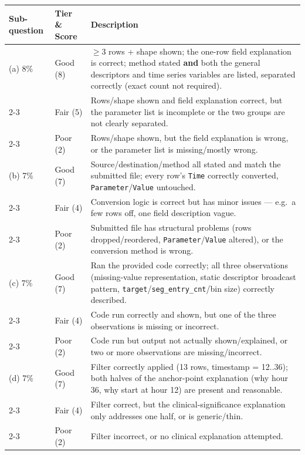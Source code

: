 \documentclass{article}
\begin{document}
\begin{center}
\footnotesize
\begin{tabular}{|p{3cm}|p{1.8cm}|p{9.3cm}|}
\hline
Sub-question & Tier \& Score & Description \\
\hline\hline
(a) 8\% & Good (8) & $\ge$3 rows + shape shown; the one-row field explanation is correct; method stated \textbf{and} both the general descriptors and time series variables are listed, separated correctly (exact count not required). \\
\cline{2-3}
 & Fair (5) & Rows/shape shown and field explanation correct, but the parameter list is incomplete or the two groups are not clearly separated. \\
\cline{2-3}
 & Poor (2) & Rows/shape shown, but the field explanation is wrong, or the parameter list is missing/mostly wrong. \\
\hline\hline
(b) 7\% & Good (7) & Source/destination/method all stated and match the submitted file; every row's \texttt{Time} correctly converted, \texttt{Parameter}/\texttt{Value} untouched. \\
\cline{2-3}
 & Fair (4) & Conversion logic is correct but has minor issues --- e.g.\ a few rows off, one field description vague. \\
\cline{2-3}
 & Poor (2) & Submitted file has structural problems (rows dropped/reordered, \texttt{Parameter}/\texttt{Value} altered), or the conversion method is wrong. \\
\hline\hline
(c) 7\% & Good (7) & Ran the provided code correctly; all three observations (missing-value representation, static descriptor broadcast pattern, \texttt{target}/\texttt{seg\_entry\_cnt}/bin size) correctly described. \\
\cline{2-3}
 & Fair (4) & Code run correctly and shown, but one of the three observations is missing or incorrect. \\
\cline{2-3}
 & Poor (2) & Code run but output not actually shown/explained, or two or more observations are missing/incorrect. \\
\hline\hline
(d) 7\% & Good (7) & Filter correctly applied (13 rows, timestamp = 12..36); both halves of the anchor-point explanation (why hour 36, why start at hour 12) are present and reasonable. \\
\cline{2-3}
 & Fair (4) & Filter correct, but the clinical-significance explanation only addresses one half, or is generic/thin. \\
\cline{2-3}
 & Poor (2) & Filter incorrect, or no clinical explanation attempted. \\

\end{tabular}
\end{center}
\end{document}
